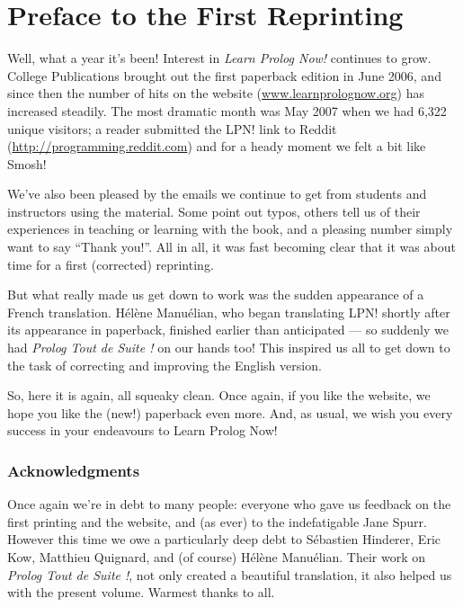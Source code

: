 
\chapter*{Preface to the First Reprinting}\label{PREFACE2}


Well, what a year it's been! Interest in \textit{Learn Prolog Now!}
continues to grow. College Publications brought out the first
paperback edition in June 2006, and since then the number of hits on
the website (\url{www.learnprolognow.org}) has increased steadily. The
most dramatic month was May 2007 when we had 6,322 unique visitors; a reader
submitted the LPN! link to Reddit (\url{http://programming.reddit.com})
and for a heady moment we felt a bit like Smosh!

We've also been pleased by the emails we continue to get from students
and instructors using the material. Some point out typos, others tell
us of their experiences in teaching or learning with the book, and
a pleasing number simply want to say ``Thank you!''.  All in all, it
was fast becoming clear that it was about time for a first (corrected)
reprinting.

But what really made us get down to work was the sudden appearance of
a French translation. H\'{e}l\`{e}ne Manu\'{e}lian, who began
translating LPN! shortly after its appearance in paperback, finished
earlier than anticipated --- so suddenly we had \textit{Prolog Tout de
Suite !}  on our hands too! This inspired us all to get down to the
task of correcting and improving the English version.

So, here it is again, all squeaky clean. Once again, if you like the
website, we hope you like the (new!) paperback even more. And, as
usual, we wish you every success in your endeavours to Learn Prolog
Now!

\subsection*{Acknowledgments}

Once again we're in debt to many people: everyone who gave us feedback
on the first printing and the website, and (as ever) to the
indefatigable Jane Spurr. However this time we owe a particularly deep
debt to S\'{e}bastien Hinderer, Eric Kow, Matthieu Quignard,
and (of course) H\'{e}l\`{e}ne Manu\'{e}lian. Their work on
\textit{Prolog Tout de Suite !}, not only created a beautiful
translation, it also helped us with the present volume. Warmest thanks
to all.

\clearpage

